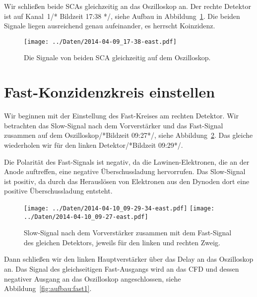 Wir schließen beide SCAs gleichzeitig an das Oszilloskop an. Der rechte
Detektor ist auf Kanal~1/* Bildzeit 17:38 */, siehe Aufbau in
Abbildung~\ref{fig:beide_sca}. Die beiden Signale liegen ausreichend genau
aufeinander, es herrscht Koinzidenz.

\begin{figure}[htbp]
    \centering
    \texttt{[image: ../Daten/2014-04-09\_17-38-east.pdf]}
    \hfill
    \caption{%
        Die Signale von beiden SCA gleichzeitig auf dem Oszilloskop.
    }
    \label{fig:beide_sca}
\end{figure}


\section{Fast-Konzidenzkreis einstellen}

Wir beginnen mit der Einstellung des Fast-Kreises am rechten Detektor. Wir
betrachten das Slow-Signal nach dem Vorverstärker und das Fast-Signal zusammen
auf dem Oszilloskop/*Bildzeit 09:27*/, siehe
Abbildung~\ref{fig:fast_einstellen}. Das gleiche wiederholen wir für den linken
Detektor/*Bildzeit 09:29*/.

Die Polarität des Fast-Signals ist negativ, da die Lawinen-Elektronen, die an
der Anode auftreffen, eine negative Überschussladung hervorrufen. Das
Slow-Signal ist positiv, da durch das Herauslösen von Elektronen aus den
Dynoden dort eine positive Überschussladung entsteht.

\begin{figure}[htbp]
    \centering
    \texttt{[image: ../Daten/2014-04-10\_09-29-34-east.pdf]}
    \hfill
    \texttt{[image: ../Daten/2014-04-10\_09-27-east.pdf]}
    \caption{%
        Slow-Signal nach dem Vorverstärker zusammen mit dem Fast-Signal des
        gleichen Detektors, jeweils für den linken und rechten Zweig.
    }
    \label{fig:fast_einstellen}
\end{figure}

Dann schließen wir den linken Hauptverstärker über das Delay an das
Oszilloskop an. Das Signal des gleichseitigen Fast-Ausgangs wird an das CFD
und dessen negativer Ausgang an das Oszilloskop angeschlossen, siehe
Abbildung~\ref{fig:aufbau:fast1}.

